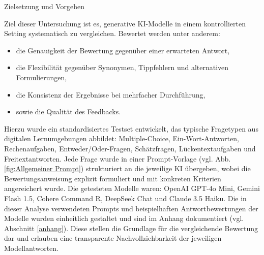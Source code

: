 \documentclass[a4paper,12pt]{article}
\begin{document}
Zielsetzung und Vorgehen

Ziel dieser Untersuchung ist es, generative KI-Modelle in einem kontrollierten Setting systematisch zu vergleichen. Bewertet werden unter anderem:

\begin{itemize}
  \item die Genauigkeit der Bewertung gegenüber einer erwarteten Antwort,
  \item die Flexibilität gegenüber Synonymen, Tippfehlern und alternativen Formulierungen,
  \item die Konsistenz der Ergebnisse bei mehrfacher Durchführung,
  \item sowie die Qualität des Feedbacks.
\end{itemize}

Hierzu wurde ein standardisiertes Testset entwickelt, das typische Fragetypen aus digitalen Lernumgebungen abbildet: Multiple-Choice, Ein-Wort-Antworten, Rechenaufgaben, Entweder/Oder-Fragen, Schätzfragen, Lückentextaufgaben und Freitextantworten. Jede Frage wurde in einer Prompt-Vorlage (vgl. Abb. \ref{fig:Allgemeiner Prompt}) strukturiert an die jeweilige KI übergeben, wobei die Bewertungsanweisung explizit formuliert und mit konkreten Kriterien angereichert wurde. Die getesteten Modelle waren: OpenAI GPT-4o Mini, Gemini Flash 1.5, Cohere Command R, DeepSeek Chat und Claude 3.5 Haiku.
Die in dieser Analyse verwendeten Prompts und beispielhaften Antwortbewertungen der Modelle wurden einheitlich gestaltet und sind im Anhang dokumentiert (vgl. Abschnitt \ref{anhang}). Diese stellen die Grundlage für die vergleichende Bewertung dar und erlauben eine transparente Nachvollziehbarkeit der jeweiligen Modellantworten.

\newpage
\end{document}
